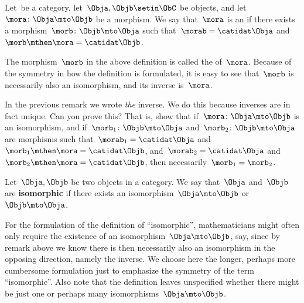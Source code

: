\begin{ctdefinition}[Isomorphism]
    \label{def:isomorphism}
    Let~\CatC be a category, let~$\Obja,\Objb \setin \ObC$ be objects, and let~$\mora \colon \Obja \mto \Objb$ be a morphism.
    We say that~$\mora$ is an \emph{} if there exists a morphism~$\morb\colon \Objb \mto \Obja$ such that~$\morab = \catidat\Obja$ and~$\morb \mthen \mora = \catidat\Objb$.
\end{ctdefinition}

\begin{remark}
    \label{rem:inverse}
    The morphism~$\morb$ in the above definition is called the \textbf{} of~$\mora$.
    Because of the symmetry in how the definition is formulated, it is easy to see that~$\morb$ is necessarily also an isomorphism, and its inverse is~$\mora$.
\end{remark}

\begin{exercise}
    \label{ex:isoinverse}
    In the previous remark we wrote \emph{the} inverse.
    We do this because inverses are in fact unique.
    Can you prove this?
    That is, show that if~$\mora \colon \Obja \mto \Objb$ is an isomorphism, and if~$\morb_1\colon \Objb \mto \Obja$ and~$\morb_2\colon \Objb \mto \Obja$ are morphisms such that~$\morab_1 = \catidat\Obja$ and~$\morb_1 \mthen \mora = \catidat\Objb$, and~$\morab_2 = \catidat\Obja$ and~$\morb_2 \mthen \mora = \catidat\Objb$, then necessarily~$\morb_1 = \morb_2$.
\end{exercise}
\begin{solution}
    \missingsolution

\end{solution}

\begin{ctdefinition}\label{def:isomorphic-objects}
    Let~$\Obja,\Objb$ be two objects in a category.
    We say that~$\Obja$ and~$\Objb$ are \textbf{isomorphic} if there exists an isomorphism~$\Obja \mto \Objb$ or~$\Objb \mto \Obja$.
\end{ctdefinition}

For the formulation of the definition of ``isomorphic'', mathematicians might often only require the existence of an isomorphism~$\Obja \mto \Objb$, say, since by remark above we know there is then necessarily also an isomorphism in the opposing direction, namely the inverse.
We choose here the longer, perhaps more cumbersome formulation just to emphasize the symmetry of the term ``isomorphic''.
Also note that the definition leaves unspecified whether there might be just one or perhaps many isomorphisms~$\Obja \mto \Objb$.

